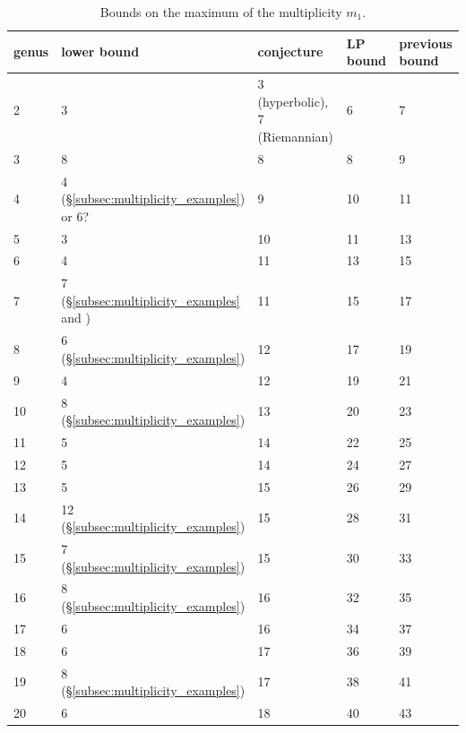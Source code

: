 \documentclass[12pt]{amsart}
\numberwithin{equation}{section}
\begin{document}
{\footnotesize
\begin{table}[htp] 
\centering
\caption{Bounds on the maximum of the multiplicity $m_1$.} \label{table:mult}
\begin{tabular}{|l|l|l|l|l|}
\hline
genus & lower bound & conjecture & LP bound & previous bound \\
\hline
2 & 3 \cite{Klein} & 3 {\footnotesize(hyperbolic)}, 7 {\footnotesize (Riemannian)} & 6 \cite{Klein} & 7 \cite{Sevennec}  \\ 
3 & 8 \cite{Klein} & 8 & 8 \cite{Klein}  & 9 \cite{Sevennec} \\ 
4 & 4 (\S\ref{subsec:multiplicity_examples}) or 6? \cite{Cook} &9& 10  & 11 \cite{Sevennec} \\ 
5 & 3 \cite{CCV} &10& 11 & 13 \cite{Sevennec} \\ 
6 &  4  \cite{CCV} &11& 13 & 15 \cite{Sevennec}\\ 
7 &  7 (\S\ref{subsec:multiplicity_examples} and \cite{Lee})  &11& 15 & 17 \cite{Sevennec}\\
8 &  6 (\S\ref{subsec:multiplicity_examples}) &12& 17 & 19 \cite{Sevennec}\\ 
9 &  4 \cite{CCV}&12& 19 & 21 \cite{Sevennec}\\ 
10 & 8 (\S\ref{subsec:multiplicity_examples}) &13& 20 & 23 \cite{Sevennec}\\ 
11 & 5 \cite{CCV}&14& 22 & 25 \cite{Sevennec}\\ 
12 & 5 \cite{CCV}&14& 24 & 27 \cite{Sevennec}\\ 
13 & 5 \cite{CCV}&15& 26 & 29 \cite{Sevennec}\\ 
14 & 12 (\S\ref{subsec:multiplicity_examples}) &15& 28 & 31 \cite{Sevennec}\\ 
15 & 7 (\S\ref{subsec:multiplicity_examples}) &15& 30 & 33 \cite{Sevennec}\\ 
16 & 8 (\S\ref{subsec:multiplicity_examples}) &16& 32 & 35 \cite{Sevennec}\\ 
17 & 6 \cite{CCV} &16& 34 & 37 \cite{Sevennec}\\
18 & 6 \cite{CCV} &17& 36 & 39 \cite{Sevennec}\\  
19 & 8 (\S\ref{subsec:multiplicity_examples}) &17& 38 & 41 \cite{Sevennec}\\ 
20 & 6 \cite{CCV} &18& 40 & 43 \cite{Sevennec}\\ 
\hline
\end{tabular}

\end{table}
}
\end{document}
